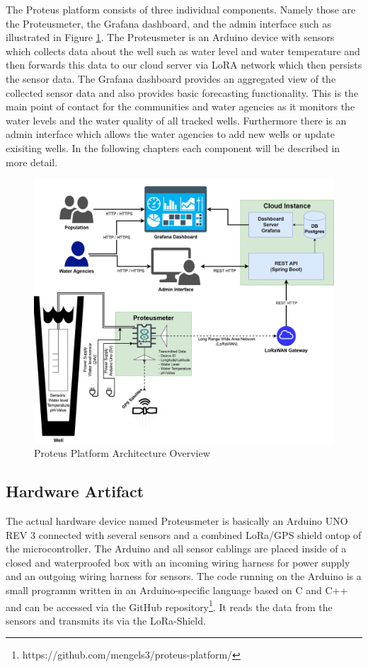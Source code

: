 \documentclass[11pt, letterpaper]{article}
\begin{document}
The Proteus platform consists of three individual components. Namely those are the Proteusmeter, the Grafana dashboard, and the admin interface such as illustrated in Figure \ref{Architecture}. The Proteusmeter is an Arduino device with sensors which collects data about the well such as water level and water temperature and then forwards this data to our cloud server via LoRA network which then persists the sensor data. The Grafana dashboard provides an aggregated view of the collected sensor data and also provides basic forecasting functionality. This is the main point of contact for the communities and water agencies as it monitors the water levels and the water quality of all tracked wells. Furthermore there is an admin interface which allows the water agencies to add new wells or update exisiting wells. In the following chapters each component will be described in more detail.

\begin{figure}[ht!]
	\centering
	\includegraphics[width=120mm]{figures/architecture.png}
	\caption{Proteus Platform Architecture Overview \label{Architecture}}
\end{figure}

\subsection{Hardware Artifact}
The actual hardware device named Proteusmeter is basically an Arduino UNO REV 3 connected with several sensors and a combined LoRa/GPS shield ontop of the microcontroller. The Arduino and all sensor cablings are placed inside of a closed and waterproofed box with an incoming wiring harness for power supply and an outgoing wiring harness for sensors. The code running on the Arduino is a small programm written in an Arduino-specific language based on C and C++ and can be accessed via the GitHub repository\footnote{https://github.com/mengels3/proteus-platform/}. It reads the data from the sensors and transmits its via the LoRa-Shield.
\end{document}
